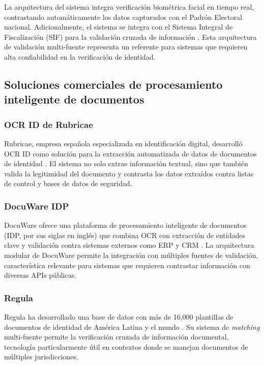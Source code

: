 \documentclass[12pt,a4paper,oneside]{book}
\begin{document}
La arquitectura del sistema integra verificación biométrica facial en tiempo real, contrastando automáticamente los datos capturados con el Padrón Electoral nacional. Adicionalmente, el sistema se integra con el Sistema Integral de Fiscalización (SIF) para la validación cruzada de información \cite{ine2022registro}. Esta arquitectura de validación multi-fuente representa un referente para sistemas que requieren alta confiabilidad en la verificación de identidad.

\subsection{Soluciones comerciales de procesamiento inteligente de documentos}

\subsubsection{OCR ID de Rubricae}

Rubricae, empresa española especializada en identificación digital, desarrolló OCR ID como solución para la extracción automatizada de datos de documentos de identidad \cite{rubricae2023ocrid}. El sistema no solo extrae información textual, sino que también valida la legitimidad del documento y contrasta los datos extraídos contra listas de control y bases de datos de seguridad.

\subsubsection{DocuWare IDP}

DocuWare ofrece una plataforma de procesamiento inteligente de documentos (IDP, por sus siglas en inglés) que combina OCR con extracción de entidades clave y validación contra sistemas externos como ERP y CRM \cite{docuware2023idp}. La arquitectura modular de DocuWare permite la integración con múltiples fuentes de validación, característica relevante para sistemas que requieren contrastar información con diversas APIs públicas.

\subsubsection{Regula}

Regula ha desarrollado una base de datos con más de 16,000 plantillas de documentos de identidad de América Latina y el mundo \cite{regula2023templates}. Su sistema de \textit{matching} multi-fuente permite la verificación cruzada de información documental, tecnología particularmente útil en contextos donde se manejan documentos de múltiples jurisdicciones.
\end{document}
